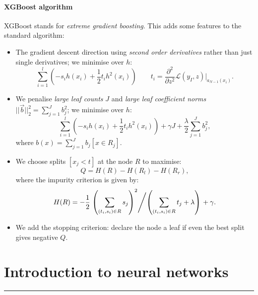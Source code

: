 \newpage
\subsection{XGBoost algorithm}
XGBoost stands for \textit{extreme gradient boosting}. This adds some features to the standard algorithm:
\begin{itemize}
\item The gradient descent direction using \textit{second order derivatives} rather than just single derivatives; we minimise over $h$:
\begin{equation*}
\sum_{i=1}^{l} \left( -s_i h(x_i) + \frac{1}{2} t_i h^2(x_i) \right) \qquad t_i = \frac{\partial^2}{\partial z^2} \mathcal{L}(y_I, z) \bigg|_{a_{N-1}(x_i)}.
\end{equation*}
\item We penalise \textit{large leaf counts} $J$ and \textit{large leaf coefficient norms} $||\vec{b}||_2^2 = \displaystyle \sum_{j=1}^{J} b_j^2$; we minimise over $h$:
\begin{equation*}
\sum_{i=1}^{l} \left( -s_i h(x_i) + \frac{1}{2} t_i h^2(x_i) \right) + \gamma J + \frac{\lambda}{2} \sum_{j=1}^{J} b_j^2,
\end{equation*}
where $b(x) = \displaystyle \sum_{j=1}^{J} b_j[x \in R_j]$. 
\item We choose splits $[x_j < t]$ at the node $R$ to maximise:
\begin{equation*}
Q = H(R) - H(R_l) - H(R_r),
\end{equation*}
where the impurity criterion is given by:
\begin{equation*}
H(R) = -\frac{1}{2} \left. \left( \sum_{(t_i,s_i) \in R} s_j \right)^2 \middle/ \left( \sum_{(t_i,s_i) \in R} t_j + \lambda \right) \right. + \gamma. 
\end{equation*}
\item We add the stopping criterion: declare the node a leaf if even the best split gives negative $Q$. 
\end{itemize}















\newpage
\part{Introduction to neural networks}
\hrule
\noindent \\
